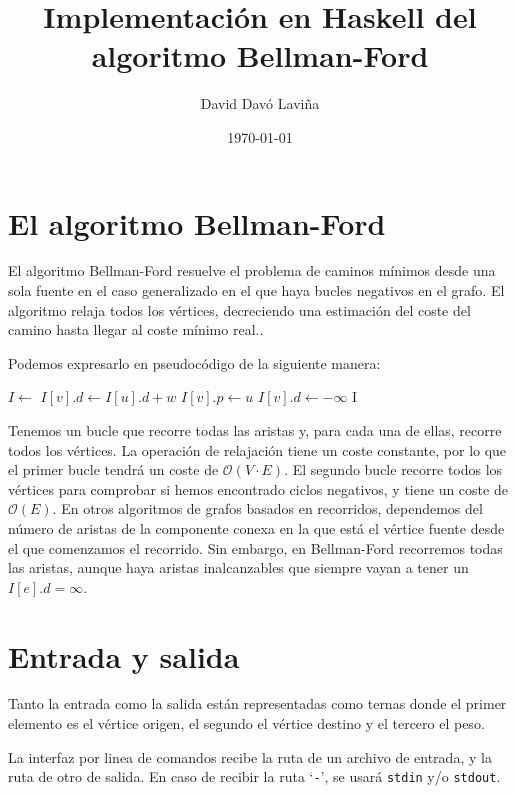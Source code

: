\documentclass{article}
\title{Implementación en Haskell del algoritmo Bellman-Ford}
\author{David Davó Laviña}
\date{\today{}}
\begin{document}
\section{El algoritmo Bellman-Ford}
El algoritmo Bellman-Ford resuelve el problema de caminos mínimos desde una sola fuente en el caso generalizado en el que haya bucles negativos en el grafo. El algoritmo relaja todos los vértices, decreciendo una estimación del coste del camino hasta llegar al coste mínimo real.\cite{CormenBellmanFord}.

Podemos expresarlo en pseudocódigo de la siguiente manera:

\vspace{3mm}
\begin{algorithmic}
	\State $I\gets$
				\State $I[v].d\gets I[u].d + w$
				\State $I[v].p\gets u$
			\EndIf
		\EndFor
	\EndFor
			\State $I[v].d\gets-\infty$
		\EndIf
	\EndFor
	\State\Return I
\EndFunction
\end{algorithmic}
\vspace{3mm}

Tenemos un bucle que recorre todas las aristas y, para cada una de ellas, recorre todos los vértices. La operación de relajación tiene un coste constante, por lo que el primer bucle tendrá un coste de $\mathcal{O}\left(V\cdot E\right)$. El segundo bucle recorre todos los vértices para comprobar si hemos encontrado ciclos negativos, y tiene un coste de $\mathcal{O}\left(E\right)$. En otros algoritmos de grafos basados en recorridos, dependemos del número de aristas de la componente conexa en la que está el vértice fuente desde el que comenzamos el recorrido. Sin embargo, en Bellman-Ford recorremos todas las aristas, aunque haya aristas inalcanzables que siempre vayan a tener un $I[e].d = \infty$.

\section{Entrada y salida}
Tanto la entrada como la salida están representadas como ternas donde el primer elemento es el vértice origen, el segundo el vértice destino y el tercero el peso.

La interfaz por linea de comandos recibe la ruta de un archivo de entrada, y la ruta de otro de salida. En caso de recibir la ruta `\texttt{-}', se usará \texttt{stdin} y/o \texttt{stdout}.
\end{document}
